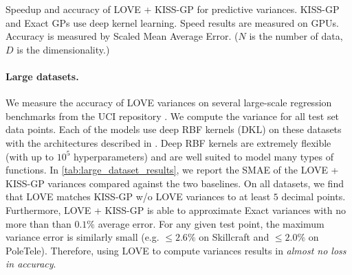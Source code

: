 \begin{table}[t!]
  \caption[Speedup and accuracy of LOVE + KISS-GP{} for predictive variances.]{
    Speedup and accuracy of LOVE + KISS-GP{} for predictive variances.
    KISS-GP and Exact GPs use deep kernel learning.
    Speed results are measured on GPUs.
    Accuracy is measured by Scaled Mean Average Error.
    ($N$ is the number of data, $D$ is the dimensionality.)
    \label{tab:large_dataset_results}
  }
  \vspace{0.5ex}
  \centering
  \resizebox{\textwidth}{!}{%
    
  }
  \vspace{1em}

  \resizebox{\textwidth}{!}{%
    
  }
\end{table}

\paragraph{Large datasets.}
We measure the accuracy of LOVE{} variances on several large-scale regression benchmarks from the UCI repository \cite{asuncion2007uci}.
We compute the variance for all test set data points.
Each of the models use deep RBF kernels (DKL) on these datasets with the architectures described in \cite{wilson2016deep}.
Deep RBF kernels are extremely flexible (with up to $10^5$ hyperparameters) and are well suited to model many types of functions.
In \cref{tab:large_dataset_results}, we report the SMAE of the LOVE + KISS-GP{} variances compared against the two baselines.
On all datasets, we find that LOVE{} matches KISS-GP w/o LOVE{} variances to at least $5$ decimal points.
Furthermore, LOVE + KISS-GP{} is able to approximate Exact variances with no more than than $0.1\%$ average error.
For any given test point, the maximum variance error is similarly small (e.g. $\leq \! 2.6\%$ on Skillcraft and $\leq \! 2.0\%$ on PoleTele).
Therefore, using LOVE{} to compute variances results in \emph{almost no loss in accuracy}.

